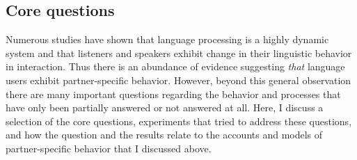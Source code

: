 \subsection{Core questions}
\label{subsec:partner-behav-core-questions}

Numerous studies have shown that language processing is a highly dynamic system and that listeners and speakers exhibit change in their linguistic behavior in interaction.
Thus there is an abundance of evidence suggesting \textit{that} language users exhibit partner-specific behavior. However, beyond this general observation
there are many important questions regarding the behavior and processes that have only been partially answered or not answered at all. Here, I discuss a selection of the core questions, experiments
that tried to address these questions, and how the question and the results relate to the accounts and models of partner-specific behavior that I discussed above.

